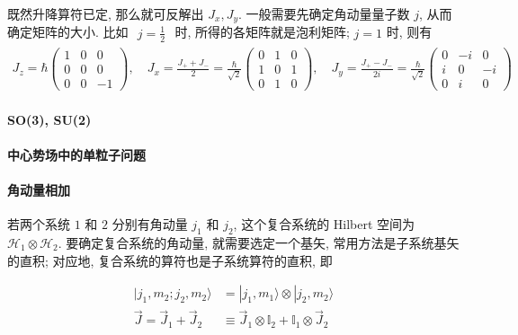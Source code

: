 \documentclass[../../main.tex]{subfiles}
\begin{document}
既然升降算符已定, 那么就可反解出 $J_{x},J_{y}$. 一般需要先确定角动量量子数 $j$, 从而确定矩阵的大小. 比如 $\begin{aligned}
    j = \frac{1}{2}
\end{aligned}$ 时, 所得的各矩阵就是泡利矩阵; $j = 1$ 时, 则有
\begin{align*}
    J_{z} = \hbar\begin{pmatrix}
            1 & 0 & 0\\
            0 & 0 & 0\\
            0 & 0 & -1
        \end{pmatrix},\quad J_{x} = \frac{J_{+} + J_{-}}{2} = \frac{\hbar}{\sqrt{2}}\begin{pmatrix}
            0 & 1 & 0\\
            1 & 0 & 1\\
            0 & 1 & 0
        \end{pmatrix},\quad J_{y} = \frac{J_{+} - J_{-}}{2i} = \frac{\hbar}{\sqrt{2}}\begin{pmatrix}
            0 & -i & 0\\
            i & 0 & -i\\
            0 & i & 0
        \end{pmatrix}
\end{align*}

\paragraph{SO(3), SU(2)}
\paragraph{中心势场中的单粒子问题}
\paragraph{角动量相加}
若两个系统 $1$ 和 $2$ 分别有角动量 $j_{1}$ 和 $j_{2}$, 这个复合系统的 Hilbert 空间为 $\mathcal{H}_{1}\otimes \mathcal{H}_{2}$. 要确定复合系统的角动量, 就需要选定一个基矢, 常用方法是子系统基矢的直积; 对应地, 复合系统的算符也是子系统算符的直积, 即

\begin{align*}
    |j_{1},m_{2};j_{2},m_{2}\rangle &= |j_{1},m_{1}\rangle \otimes |j_{2},m_{2}\rangle\\
    \vec{J} = \vec{J}_{1} + \vec{J}_{2} &\equiv \vec{J}_{1}\otimes \mathbb{I}_{2} + \mathbb{I}_{1}\otimes \vec{J}_{2}
\end{align*}
\end{document}
